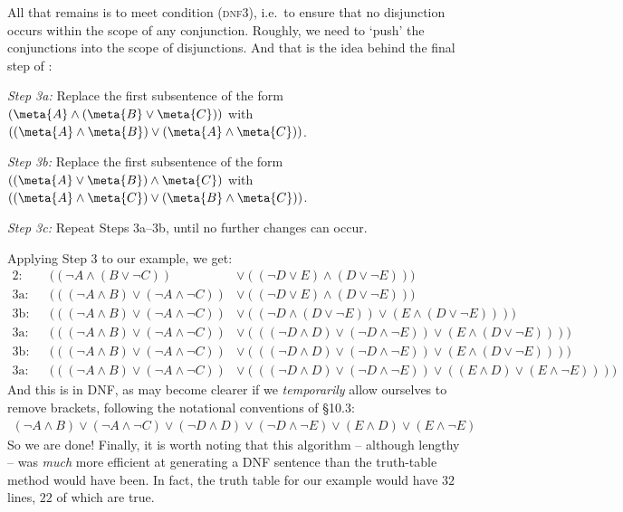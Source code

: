 All that remains is to meet condition (\textsc{dnf3}), i.e.\ to ensure that no disjunction occurs within the scope of any conjunction. Roughly, we need to `push' the conjunctions into the scope of disjunctions. And that is the idea behind the final step of \intoDNF:
	\begin{ebullet}
		\item[\emph{Step 3a:}]  Replace the first subsentence of the form $(\meta{A} \land (\meta{B} \lor \meta{C}))$ with $((\meta{A} \land \meta{B}) \lor (\meta{A} \land \meta{C}))$. 		
		\item[\emph{Step 3b:}]  Replace the first subsentence of the form $((\meta{A} \lor \meta{B}) \land \meta{C})$ with $((\meta{A} \land \meta{C}) \lor (\meta{B} \land \meta{C}))$. 
	\item[\emph{Step 3c:}] Repeat Steps 3a--3b, until no further changes can occur.
	\end{ebullet}
Applying Step 3 to our example, we get:
{\small	\begin{align*}
		\text{2}: & & ((\lnot A \land (B \lor \lnot  C)) &\lor  ((\lnot D \lor E) \land (D \lor  \lnot E)))\\
		\text{3a}: & & (((\lnot A \land B) \lor (\lnot A \land \lnot  C)) &\lor  ((\lnot D \lor E) \land (D \lor  \lnot E)))\\	
		\text{3b}: & & (((\lnot A \land B) \lor (\lnot A \land \lnot  C)) &\lor  ((\lnot D \land (D \lor \lnot E)) \lor (E \land (D \lor  \lnot E))))\\
		\text{3a}: & & (((\lnot A \land B) \lor (\lnot A \land \lnot  C)) &\lor  (((\lnot D \land D) \lor (\lnot D \land \lnot E)) \lor (E \land (D \lor  \lnot E))))\\
		\text{3b}: & & (((\lnot A \land B) \lor (\lnot A \land \lnot  C)) &\lor  (((\lnot D \land D) \lor (\lnot D \land \lnot E)) \lor (E \land (D \lor  \lnot E))))\\
		\text{3a}: & & (((\lnot A \land B) \lor (\lnot A \land \lnot  C)) &\lor  (((\lnot D \land D) \lor (\lnot D \land \lnot E)) \lor ((E \land D) \lor  (E \land \lnot E))))
	\end{align*}}\noindent 
And this is in DNF, as may become clearer if we \emph{temporarily} allow ourselves to remove brackets, following the notational conventions of \forallxref{} \S10.3:
		\begin{align*}
		(\lnot A \land B) \lor (\lnot A \land \lnot  C) \lor  (\lnot D \land D) \lor (\lnot D \land \lnot E) \lor (E \land D) \lor  (E \land \lnot E)
		\end{align*}
So we are done! Finally, it is worth noting that this algorithm -- although lengthy -- was \emph{much} more efficient at generating a DNF sentence than the truth-table method would have been. In fact, the truth table for our example would have $32$ lines, $22$ of which are true.

